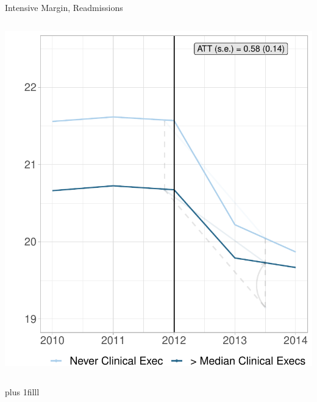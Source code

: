 \documentclass[notes,11pt, aspectratio=169]{beamer}
\newcommand{\btVFill}{\vskip0pt plus 1filll}
\begin{document}
\begin{frame}{Intensive Margin, Readmissions}
\begin{columns}
        \includegraphics[width=.8\textwidth]{Objects/cont_abovemedread_md_nomd_synth_graph.pdf}
    \end{columns}
    \btVFill

    \hyperlink{main:readrates}{}
\end{frame}
\end{document}
